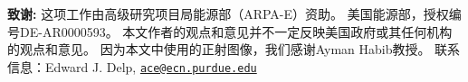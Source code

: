 \documentclass[10pt,twocolumn,letterpaper,UTF8]{article}
\begin{document}
\vspace{1em}

{
\small \textbf{致谢:}
    这项工作由高级研究项目局能源部（ARPA-E）资助。
    美国能源部，授权编号DE-AR0000593。
    本文作者的观点和意见并不一定反映美国政府或其任何机构的观点和意见。
    因为本文中使用的正射图像，我们感谢Ayman Habib教授。
    联系信息：Edward J. Delp, \texttt{\href{mailto:ace@ecn.purdue.edu}{ace@ecn.purdue.edu}}
}

\clearpage




\renewcommand{\thesection}{\Alph{section}}
\end{document}
